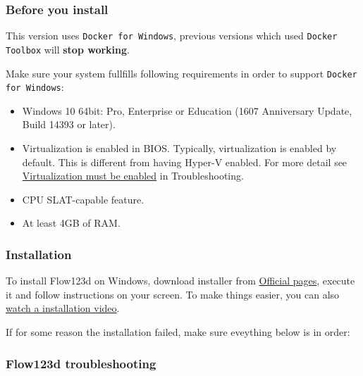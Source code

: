 \subsubsection{Before you install}

This version uses \verb'Docker for Windows', previous versions which used \verb'Docker Toolbox' will \textbf{stop working}.

Make sure your system fullfills following requirements in order to support \verb'Docker for Windows':
\begin{itemize}
    \item Windows 10 64bit: Pro, Enterprise or Education (1607 Anniversary Update, Build 14393 or later).
    \item Virtualization is enabled in BIOS. Typically, virtualization is enabled by default. This is different from having Hyper-V enabled. For more detail see \href{https://docs.docker.com/docker-for-windows/troubleshoot/#virtualization-must-be-enabled}{Virtualization must be enabled} in Troubleshooting.
    \item CPU SLAT-capable feature.
    \item At least 4GB of RAM.
\end{itemize}


\subsubsection{Installation}

To install Flow123d on Windows, download installer from \href{http://flow123d.github.io/}{Official pages}, execute it and follow instructions
on your screen. To make things easier, you can also \href{https://www.youtube.com/watch?v=xDR2vU-1IhM}{watch a installation video}.

If for some reason the installation failed, make sure eveything below is in order:


\subsubsection{Flow123d troubleshooting}

